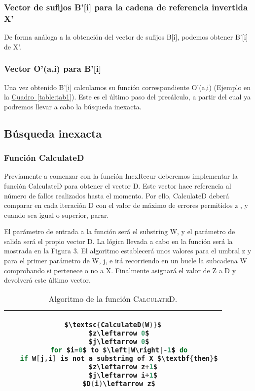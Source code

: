 \documentclass{article}
\newcommand{\tempcaption}{}
\newenvironment{codesnip}[1]{
\begin{table}[h!]
\gdef\tempcaption{#1}
\centering
\begin{tabular}{|c|}
\hline}
{\\\hline
\end{tabular}
\caption{\tempcaption}
\end{table}}
\begin{document}
\subsubsection{Vector de sufijos B’[i] para la cadena de referencia
invertida X’}

De forma análoga a la obtención del vector de sufijos B[i], podemos
obtener B’[i] de X’.

\subsubsection{Vector O’(a,i) para B’[i]}

Una vez obtenido B’[i] calculamos su función correspondiente O’(a,i)
(Ejemplo en la \hyperref[table:tab1]{Cuadro~\ref*{table:tab1}}).
Este es el último paso del precálculo, a partir del cual ya podremos
llevar a cabo la búsqueda inexacta.

\subsection{Búsqueda inexacta}

\subsubsection{Función CalculateD}

Previamente a comenzar con la función InexRecur deberemos  implementar
la función CalculateD para obtener el  vector  D.   Este  vector  hace
referencia al número de fallos realizados hasta el momento.  Por ello,
CalculateD deberá comparar en cada iteración D con el valor de	máximo
de errores permitidos z ,  y  cuando  sea  igual  o  superior,	parar.

El parámetro de entrada a  la  función	será  el  substring  W,  y  el
parámetro de salida será el propio vector D.  La lógica llevada a cabo
en la  función	será  la  mostrada  en	la  Figura  3.	 El  algoritmo
establecerá unos valores para el umbral z y para el  primer  parámetro
de W, j, e irá recorriendo en un bucle la subcadena W  comprobando  si
pertenece o no a X.  Finalmente asignará el valor de Z a D y devolverá
este último vector.

\begin{codesnip}{Algoritmo de la función \textsc{CalculateD}.\cite{li_durbin_2009}}
\begin{lstlisting}[mathescape=true, language = C]
$\textsc{CalculateD(W)}$
   $z\leftarrow 0$
   $j\leftarrow 0$
   for $i=0$ to $\left|W\right|-1$ do
   if W[j,i] is not a substring of X $\textbf{then}$
     $z\leftarrow z+1$
     $j\leftarrow i+1$
   $D(i)\leftarrow z$
\end{lstlisting}
\end{codesnip}
\end{document}
